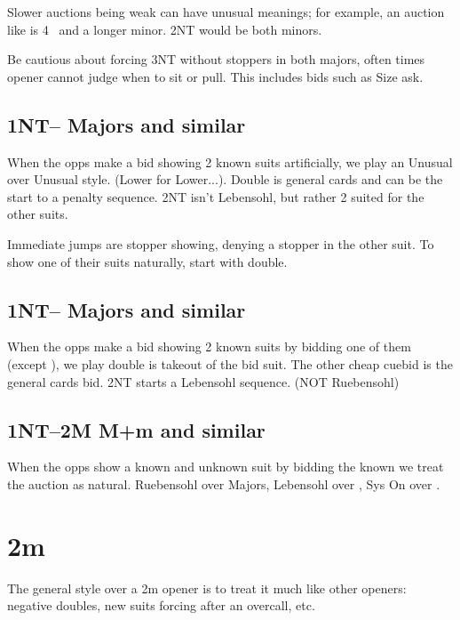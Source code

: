 \documentclass[tom-ari]{subfile}
\begin{document}
	Slower auctions being weak can have unusual meanings; for example, an auction like  is 4 \spadesuit ~and a longer minor. 2NT would be both minors. 
	
	Be cautious about forcing 3NT without stoppers in both majors, often times opener cannot judge when to sit or pull. This includes bids such as  Size ask. 

	\subsection{1NT-- Majors and similar}
	
	When the opps make a bid showing 2 known suits artificially, we play an Unusual over Unusual style. (Lower for Lower...). Double is general cards and can be the start to a penalty sequence. 2NT isn't Lebensohl, but rather 2 suited for the other suits.
	
	Immediate jumps are stopper showing, denying a stopper in the other suit. To show one of their suits naturally, start with double.
	
	\subsection{1NT-- Majors and similar}
	
	When the opps make a bid showing 2 known suits by bidding one of them (except ), we play double is takeout of the bid suit. The other cheap cuebid is the general cards bid. 2NT starts a Lebensohl sequence. (NOT Ruebensohl)
	
	
	\subsection{1NT--2M M+m and similar}
	
	When the opps show a known and unknown suit by bidding the known we treat the auction as natural. Ruebensohl over Majors, Lebensohl over \diamondsuit, Sys On over \clubsuit.

	
	\section{2m}
	
	The general style over a 2m opener is to treat it much like other openers: negative doubles, new suits forcing after an overcall, etc.
	
\end{document}

